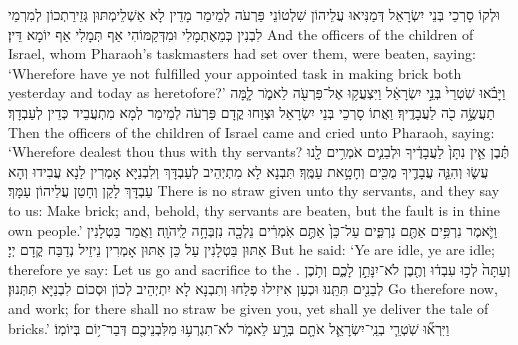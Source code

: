 {וּלְקוֹ סָרְכֵי בְּנֵי יִשְׂרָאֵל דְּמַנִּיאוּ עֲלֵיהוֹן שִׁלְטוֹנֵי פַּרְעֹה לְמֵימַר מָדֵין לָא אַשְׁלֵימְתּוּן גְּזֵירַתְכוֹן לְמִרְמֵי לִבְנִין כְּמֵאֶתְמָלִי וּמִדְּקַמּוֹהִי אַף תְּמָלִי אַף יוֹמָא דֵּין׃}
{And the officers of the children of Israel, whom Pharaoh’s taskmasters had set over them, were beaten, saying: ‘Wherefore have ye not fulfilled your appointed task in making brick both yesterday and today as heretofore?’}{}
{וַיָּבֹ֗אוּ שֹֽׁטְרֵי֙ בְּנֵ֣י יִשְׂרָאֵ֔ל וַיִּצְעֲק֥וּ אֶל־פַּרְעֹ֖ה לֵאמֹ֑ר לָ֧מָּה תַעֲשֶׂ֦ה כֹ֖ה לַעֲבָדֶֽיךָ׃}
{וַאֲתוֹ סָרְכֵי בְּנֵי יִשְׂרָאֵל וּצְוַחוּ קֳדָם פַּרְעֹה לְמֵימַר לְמָא מִתְעֲבֵיד כְּדֵין לְעַבְדָךְ׃}
{Then the officers of the children of Israel came and cried unto Pharaoh, saying: ‘Wherefore dealest thou thus with thy servants?}{}
{תֶּ֗בֶן אֵ֤ין נִתָּן֙ לַעֲבָדֶ֔יךָ וּלְבֵנִ֛ים אֹמְרִ֥ים לָ֖נוּ עֲשׂ֑וּ וְהִנֵּ֧ה עֲבָדֶ֛יךָ מֻכִּ֖ים וְחָטָ֥את עַמֶּֽךָ׃
}
{תִּבְנָא לָא מִתְיְהֵיב לְעַבְדָּךְ וְלִבְנַיָּא אָמְרִין לַנָא עֲבִידוּ וְהָא עַבְדָּךְ לָקַן וְחָטַן עֲלֵיהוֹן עַמָּךְ׃}
{There is no straw given unto thy servants, and they say to us: Make brick; and, behold, thy servants are beaten, but the fault is in thine own people.’}{}
{וַיֹּ֛אמֶר נִרְפִּ֥ים אַתֶּ֖ם נִרְפִּ֑ים עַל־כֵּן֙ אַתֶּ֣ם אֹֽמְרִ֔ים נֵלְכָ֖ה נִזְבְּחָ֥ה לַֽיהֹוָֽה׃}
{וַאֲמַר בַּטְלָנִין אַתּוּן בַּטְלָנִין עַל כֵּן אַתּוּן אָמְרִין נֵיזֵיל נְדַבַּח קֳדָם יְיָ׃}
{But he said: ‘Ye are idle, ye are idle; therefore ye say: Let us go and sacrifice to the \lord.}{}
{וְעַתָּה֙ לְכ֣וּ עִבְד֔וּ וְתֶ֖בֶן לֹא־יִנָּתֵ֣ן לָכֶ֑ם וְתֹ֥כֶן לְבֵנִ֖ים תִּתֵּֽנוּ׃
}
{וּכְעַן אִיזִילוּ פְלַחוּ וְתִבְנָא לָא יִתְיְהֵיב לְכוֹן וּסְכוֹם לִבְנַיָּא תִּתְּנוּן׃}
{Go therefore now, and work; for there shall no straw be given you, yet shall ye deliver the tale of bricks.’}{}
{וַיִּרְא֞וּ שֹֽׁטְרֵ֧י בְנֵֽי־יִשְׂרָאֵ֛ל אֹתָ֖ם בְּרָ֣ע לֵאמֹ֑ר לֹא־תִגְרְע֥וּ מִלִּבְנֵיכֶ֖ם דְּבַר־י֥וֹם בְּיוֹמֽוֹ׃
}
